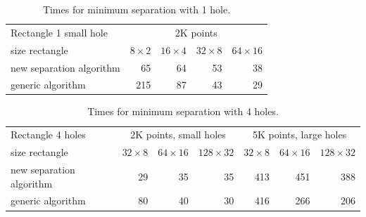 \documentclass[a4paper,USenglish]{lipics}
\def\myparagraph#1{\medskip\noindent\textbf{#1.}}
\begin{document}
\begin{table}[h!]
\begin{tabular}{l*{4}{r}}
Rectangle 1 small hole & \multicolumn{4}{c}{2K points}\\
size rectangle	&	$8\times 2$	&	$16\times 4$	&	$32\times 8$ & $64\times 16$ \\	
\hline
new separation algorithm	&	65	&	64	&	53	&	38  \\
generic algorithm			&	215	&	87	&	43	&	29
\end{tabular}
\caption{Times for minimum separation with 1 hole.}
\label{table6}
\end{table}
\begin{table}[h!]
\begin{tabular}{l*{3}{r}|*{3}{r}}
Rectangle 4 holes & \multicolumn{3}{c|}{2K points, small holes} & \multicolumn{3}{c}{5K points, large holes}\\
size rectangle	&	$32\times 8$ &	$64\times 16$ & $128\times 32$ & $32\times 8$ &	$64\times 16$ & $128\times 32$\\	
\hline
new separation algorithm	&	29	&	35	&	35	&	413 & 451 & 388  \\
generic algorithm			&	80	&	40	&	30	&	416 & 266 & 206
\end{tabular}
\caption{Times for minimum separation with 4 holes.}
\label{table7}
\end{table}




\end{document}
